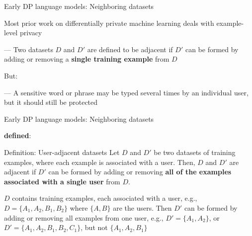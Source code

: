 \documentclass[12pt,aspectratio=169,handout]{beamer}
\begin{document}
\begin{frame}{Early DP language models: Neighboring datasets}

Most prior work on differentially private machine learning deals with example-level privacy

--- Two datasets $D$ and $D'$ are defined to be adjacent if $D'$ can be formed by adding or removing a \textbf{single training example} from $D$

But:

--- A sensitive word or phrase may be typed several times by an individual user, but it should still be protected


\end{frame}

\begin{frame}{Early DP language models: Neighboring datasets}

\citet{McMahan.et.al.2018.ICLR} \textbf{defined}:

\begin{block}{Definition: User-adjacent datasets}
\small
Let $D$ and $D'$ be two datasets of training examples, where each example is associated with a user. Then, $D$ and $D'$ are adjacent if $D'$ can be formed by adding or removing \textbf{all of the examples associated with a single user} from $D$.
\end{block}

$D$ contains training examples, each associated with a user, e.g., $D = \{A_1, A_2, B_1, B_2\}$ where $\{A, B\}$ are the users. Then $D'$ can be formed by adding or removing all examples from one user, e.g., $D' = \{A_1, A_2\}$, or $D' = \{A_1, A_2, B_1, B_2, C_1\}$, but not $\{A_1, A_2, B_1\}$



\end{frame}
\end{document}
